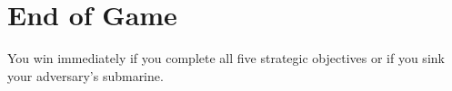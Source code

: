 \section*{End of Game}
You win immediately if you complete all five strategic objectives or if you sink your adversary's submarine. 
